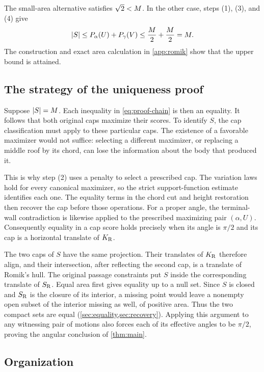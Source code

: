 The small-area alternative satisfies $\sqrt2<M$. In the other
case, steps (1), (3), and (4) give
\begin{equation}\label{eq:proof-chain}
 |S|\le P_\alpha(U)+P_\gamma(V)
     \le\frac{M}2+\frac{M}2=M.
\end{equation}
The construction and exact area calculation in \cref{app:romik}
show that the upper bound is attained.

\subsection{The strategy of the uniqueness proof}\label{sec:strategy-uniqueness}

Suppose $|S|=M$. Each inequality in \eqref{eq:proof-chain} is
then an equality. It follows that both original caps maximize their
scores. To identify $S$, the cap classification must apply to these
particular caps. The existence of a favorable maximizer would not
suffice: selecting a different maximizer, or replacing a middle roof
by its chord, can lose the information about the body that produced it.

This is why step (2) uses a penalty to select a prescribed cap. The
variation laws hold for every canonical maximizer, so the strict
support-function estimate identifies each one. The equality terms in
the chord cut and height restoration then recover the cap before
those operations. For a proper angle, the terminal-wall contradiction
is likewise applied to the prescribed maximizing pair $(\alpha,U)$.
Consequently equality in a cap score holds precisely when its angle
is $\pi/2$ and its cap is a horizontal translate of $K_{\mathrm R}$.

The two caps of $S$ have the same projection. Their translates of
$K_{\mathrm R}$ therefore align, and their intersection, after reflecting the
second cap, is a translate of Romik's hull. The original passage
constraints put $S$ inside the corresponding translate of $S_{\mathrm R}$.
Equal area first gives equality up to a null set. Since $S$ is closed
and $S_{\mathrm R}$ is the closure of its interior, a missing point would leave
a nonempty open subset of the interior missing as well, of positive
area. Thus the two compact sets are equal
(\cref{sec:equality,sec:recovery}). Applying this argument to any
witnessing pair of motions also forces each of its effective angles
to be $\pi/2$, proving the angular conclusion of \cref{thm:main}.

\subsection{Organization}

